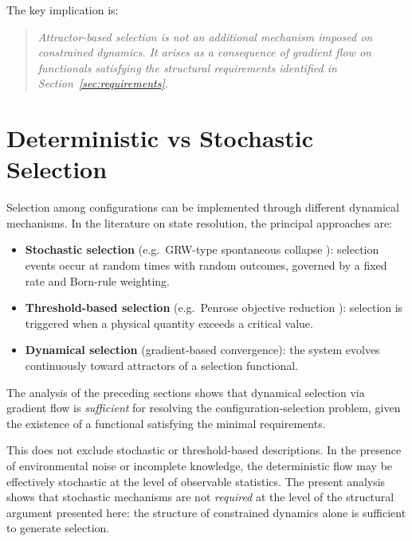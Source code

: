 \documentclass[12pt]{article}
\begin{document}
The key implication is:

\begin{quote}
    \textit{Attractor-based selection is not an additional mechanism imposed on constrained dynamics. It arises as a consequence of gradient flow on functionals satisfying the structural requirements identified in Section~\ref{sec:requirements}.}
\end{quote}

\section{Deterministic vs Stochastic Selection}\label{sec:stochastic}

Selection among configurations can be implemented through different dynamical mechanisms. In the literature on state resolution, the principal approaches are:

\begin{itemize}
    \item \textbf{Stochastic selection} (e.g.\ GRW-type spontaneous collapse \citep{GRW1986}): selection events occur at random times with random outcomes, governed by a fixed rate and Born-rule weighting.
    \item \textbf{Threshold-based selection} (e.g.\ Penrose objective reduction \citep{Penrose1996}): selection is triggered when a physical quantity exceeds a critical value.
    \item \textbf{Dynamical selection} (gradient-based convergence): the system evolves continuously toward attractors of a selection functional.
\end{itemize}

The analysis of the preceding sections shows that dynamical selection via gradient flow is \textit{sufficient} for resolving the configuration-selection problem, given the existence of a functional satisfying the minimal requirements.

This does not exclude stochastic or threshold-based descriptions. In the presence of environmental noise or incomplete knowledge, the deterministic flow may be effectively stochastic at the level of observable statistics. The present analysis shows that stochastic mechanisms are not \textit{required} at the level of the structural argument presented here: the structure of constrained dynamics alone is sufficient to generate selection.
\end{document}
